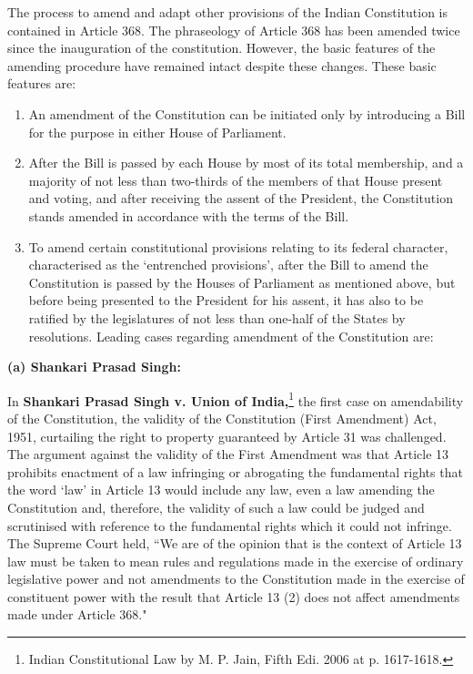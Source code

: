 \begin{multicols}{2}
\noi
The process to amend and adapt other provisions of the Indian Constitution is contained in Article
368. The phraseology of Article 368 has been amended twice since the inauguration of the
constitution. However, the basic features of the amending procedure have remained intact despite
these changes. These basic features are:

\vspace{-.3cm}

\begin{enumerate}[label=(\roman*)]
\itemsep=0pt
\item  An amendment of the Constitution can be initiated only by introducing a Bill for the purpose
in either House of Parliament.

\item After the Bill is passed by each House by most of its total membership, and a majority of not
less than two-thirds of the members of that House present and voting, and after receiving the
assent of the President, the Constitution stands amended in accordance with the terms of the Bill.

\item To amend certain constitutional provisions relating to its federal character, characterised as
the ‘entrenched provisions’, after the Bill to amend the Constitution is passed by the Houses of
Parliament as mentioned above, but before being presented to the President for his assent, it has
also to be ratified by the legislatures of not less than one-half of the States by resolutions. Leading
cases regarding amendment of the Constitution are:
\end{enumerate}

\vspace{-.3cm}

\noi
{\large \bfseries (a) Shankari Prasad Singh:}

\noi
In \textbf{Shankari Prasad Singh v. Union of India,}\footnote{Indian Constitutional Law by M. P. Jain, Fifth Edi. 2006 at p. 1617-1618.} the first case on amendability of the Constitution, the validity of the Constitution (First Amendment) Act, 1951, curtailing the right to property guaranteed by Article 31 was challenged. The argument against the validity of the First
Amendment was that Article 13 prohibits enactment of a law infringing or abrogating the
fundamental rights that the word ‘law’ in Article 13 would include any law, even a law amending
the Constitution and, therefore, the validity of such a law could be judged and scrutinised with
reference to the fundamental rights which it could not infringe. The Supreme Court held, “We are
of the opinion that is the context of Article 13 law must be taken to mean rules and regulations
made in the exercise of ordinary legislative power and not amendments to the Constitution made
in the exercise of constituent power with the result that Article 13 (2) does not affect amendments
made under Article 368."


\end{multicols}
